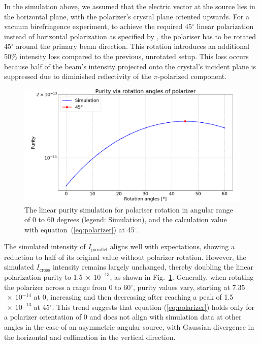 \documentclass{iucr}
\begin{document}
In the simulation above, we assumed that the electric vector at the source lies in the horizontal plane, with the polarizer’s crystal plane oriented upwards.
For a vacuum birefringence experiment, to achieve the required 45$^\circ$ linear polarization instead of horizontal polarization as specified by \cite{Shen2018}, the polariser has to be rotated 45$^\circ$ around the primary beam direction.
This rotation introduces an additional 50\% intensity loss compared to the previous, unrotated setup.
This loss occurs because half of the beam’s intensity projected onto the crystal’s incident plane is suppressed due to diminished reflectivity of the $\pi$-polarized component.

\begin{figure}\label{fig:polarizer}
\centering
\includegraphics[width=0.95\linewidth]{figures/polarizer.png}
\caption{The linear purity simulation for polariser rotation in angular range of 0 to 60 degrees (legend: Simulation), and the calculation value with equation~(\ref{eq:polarizer}) at 45$^\circ$.}
\end{figure}

The simulated intensity of  $I_\text{parallel}$ aligns well with expectations, showing a reduction to half of its original value without polarizer rotation.
However, the simulated $I_\text{cross}$ intensity remains largely unchanged, thereby doubling the linear polarization purity to 1.5$~\times~10^{-13}$, as shown in Fig.~\ref{fig:polarizer}.
Generally, when rotating the polarizer across a range from 0 to 60$^\circ$, purity values vary, starting at 7.35$~\times~10^{-14}$ at 0, increasing and then decreasing after reaching a peak of 1.5$~\times~10^{-13}$ at 45$^\circ$.
This trend suggests that equation (\ref{eq:polarizer}) holds only for a polarizer orientation of 0 and does not align with simulation data at other angles in the case of an asymmetric angular source, with Gaussian divergence in the horizontal and collimation in the vertical direction.
\end{document}

